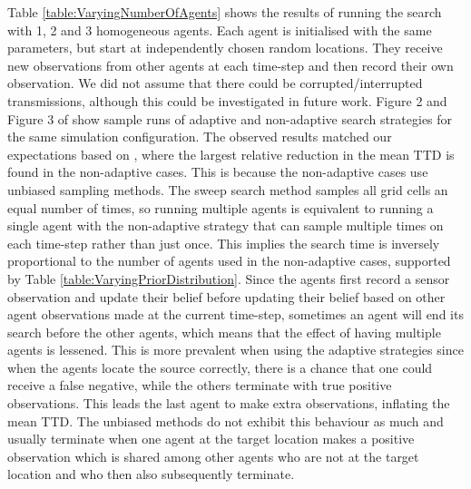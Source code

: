 Table \ref{table:VaryingNumberOfAgents} shows the results of running the search with 1, 2 and 3 homogeneous agents. Each agent is initialised with the same parameters, but start at independently chosen random locations. They receive new observations from other agents at each time-step and then record their own observation. We did not assume that there could be corrupted/interrupted transmissions, although this could be investigated in future work.
Figure 2 and Figure 3 of \cite{Chung2008Multi-agentFramework} show sample runs of adaptive and non-adaptive search strategies for the same simulation configuration. The observed results matched our expectations based on \cite{Chung2008Multi-agentFramework}, where the largest relative reduction in the mean TTD is found in the non-adaptive cases. This is because the non-adaptive cases use unbiased sampling methods. The sweep search method samples all grid cells an equal number of times, so running multiple agents is equivalent to running a single agent with the non-adaptive strategy that can sample multiple times on each time-step rather than just once. This implies the search time is inversely proportional to the number of agents used in the non-adaptive cases, supported by Table \ref{table:VaryingPriorDistribution}. Since the agents first record a sensor observation and update their belief before updating their belief based on other agent observations made at the current time-step, sometimes an agent will end its search before the other agents, which means that the effect of having multiple agents is lessened. This is more prevalent when using the adaptive strategies since when the agents locate the source correctly, there is a chance that one could receive a false negative, while the others terminate with true positive observations. This leads the last agent to make extra observations, inflating the mean TTD. The unbiased methods do not exhibit this behaviour as much and usually terminate when one agent at the target location makes a positive observation which is shared among other agents who are not at the target location and who then also subsequently terminate.

